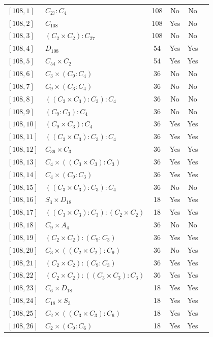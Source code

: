 \documentclass[12pt, a4paper]{article}
\theoremstyle{plain}
\theoremstyle{definition}
\begin{document}
\begin{longtable}{llcccl}
  $[108,1]$ & $C_{27} : C_4$ & 108 & No & No \\
  $[108,2]$ & $C_{108}$ & 108 & Yes & No \\
  $[108,3]$ & $(C_2 \times C_2) : C_{27}$ & 108 & No & No \\
  $[108,4]$ & $D_{108}$ & 54 & Yes & Yes \\
  $[108,5]$ & $C_{54} \times C_2$ & 54 & Yes & Yes \\
  $[108,6]$ & $C_3 \times (C_9 : C_4)$ & 36 & No & No \\
  $[108,7]$ & $C_9 \times (C_3 : C_4)$ & 36 & No & No \\
  $[108,8]$ & $((C_3 \times C_3) : C_3) : C_4$ & 36 & No & No \\
  $[108,9]$ & $(C_9 : C_3) : C_4$ & 36 & No & No \\
  $[108,10]$ & $(C_9 \times C_3) : C_4$ & 36 & Yes & Yes \\
  $[108,11]$ & $((C_3 \times C_3) : C_3) : C_4$ & 36 & Yes & Yes \\
  $[108,12]$ & $C_{36} \times C_3$ & 36 & Yes & Yes \\
  $[108,13]$ & $C_4 \times ((C_3 \times C_3) : C_3)$ & 36 & Yes & Yes \\
  $[108,14]$ & $C_4 \times (C_9 : C_3)$ & 36 & Yes & Yes \\
  $[108,15]$ & $((C_3 \times C_3) : C_3) : C_4$ & 36 & No & No \\
  $[108,16]$ & $S_3 \times D_{18}$ & 18 & Yes & Yes \\
  $[108,17]$ & $((C_3 \times C_3) : C_3) : (C_2 \times C_2)$ & 18 & Yes & Yes \\
  $[108,18]$ & $C_9 \times A_4$ & 36 & No & No \\
  $[108,19]$ & $(C_2 \times C_2) : (C_9 : C_3)$ & 36 & Yes & Yes \\
  $[108,20]$ & $C_3 \times ((C_2 \times C_2) : C_9)$ & 36 & No & Yes \\
  $[108,21]$ & $(C_2 \times C_2) : (C_9 : C_3)$ & 36 & Yes & Yes \\
  $[108,22]$ & $(C_2 \times C_2) : ((C_3 \times C_3) : C_3)$ & 36 & Yes & Yes \\
  $[108,23]$ & $C_6 \times D_{18}$ & 18 & Yes & Yes \\
  $[108,24]$ & $C_{18} \times S_3$ & 18 & Yes & Yes \\
  $[108,25]$ & $C_2 \times ((C_3 \times C_3) : C_6)$ & 18 & Yes & Yes \\
  $[108,26]$ & $C_2 \times (C_9 : C_6)$ & 18 & Yes & Yes \\

\end{longtable}
\end{document}
